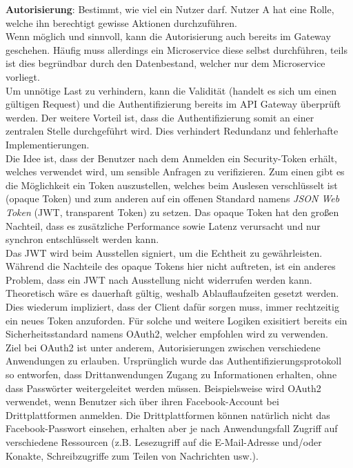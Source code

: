 \textbf{Autorisierung}: Bestimmt, wie viel ein Nutzer darf. Nutzer A hat eine Rolle, welche ihn berechtigt gewisse Aktionen durchzuführen.\cite{bruce2019mic_in_action}\\

Wenn möglich und sinnvoll, kann die Autorisierung auch bereits im Gateway geschehen. Häufig muss allerdings ein Microservice diese selbst durchführen, teils ist dies begründbar durch den Datenbestand, welcher nur dem Microservice vorliegt. \\

Um unnötige Last zu verhindern, kann die Validität (handelt es sich um einen gültigen Request) und die Authentifizierung bereits im API Gateway überprüft werden. Der weitere Vorteil ist, dass die Authentifizierung somit an einer zentralen Stelle durchgeführt wird. Dies verhindert Redundanz und fehlerhafte Implementierungen.\cite{rewe2019mic_ppp}\cite{richardson2019mic_pattern} \\

Die Idee ist, dass der Benutzer nach dem Anmelden ein Security-Token erhält, welches verwendet wird, um sensible Anfragen zu verifizieren. Zum einen gibt es die Möglichkeit ein Token auszustellen, welches beim Auslesen verschlüsselt ist (opaque Token) und zum anderen auf ein offenen Standard namens \textit{JSON Web Token} (JWT, transparent Token) zu setzen. Das opaque Token hat den großen Nachteil, dass es zusätzliche Performance sowie Latenz verursacht und nur synchron entschlüsselt werden kann.\cite{richardson2019mic_pattern} \\

Das JWT wird beim Ausstellen signiert, um die Echtheit zu gewährleisten. Während die Nachteile des opaque Tokens hier nicht auftreten, ist ein anderes Problem, dass ein JWT nach Ausstellung nicht widerrufen werden kann. Theoretisch wäre es dauerhaft gültig, weshalb Ablauflaufzeiten gesetzt werden. Dies wiederum impliziert, dass der Client dafür sorgen muss, immer rechtzeitig ein neues Token anzuforden. Für solche und weitere Logiken exisitiert bereits ein Sicherheitsstandard namens OAuth2, welcher empfohlen wird zu verwenden.\cite{richardson2019mic_pattern} \\

Ziel bei OAuth2 ist unter anderem, Autorisierungen zwischen verschiedene Anwendungen zu erlauben. Ursprünglich wurde das Authentifizierungsprotokoll so entworfen, dass Drittanwendungen Zugang zu Informationen erhalten, ohne dass Passwörter weitergeleitet werden müssen.\cite{richardson2019mic_pattern}  Beispielsweise wird OAuth2 verwendet, wenn Benutzer sich über ihren Facebook-Account bei Drittplattformen anmelden. Die Drittplattformen können natürlich nicht das Facebook-Passwort einsehen, erhalten aber je nach Anwendungsfall Zugriff auf verschiedene Ressourcen (z.B. Lesezugriff auf die E-Mail-Adresse und/oder Konakte, Schreibzugriffe zum Teilen von Nachrichten usw.). \\

